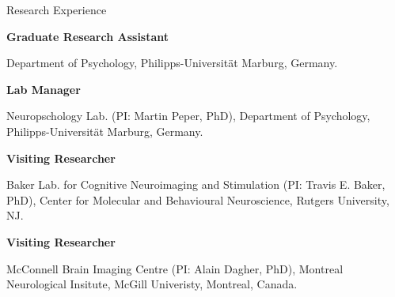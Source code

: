 \begin{rubric}{Research Experience}


\textbf{Graduate Research Assistant} 
\par Department of Psychology, Philipps-Universit\"at Marburg, Germany. 
\vspace{5pt}
\par \textbf{Lab Manager} 
\par Neuropschology Lab. (PI: Martin Peper, PhD), Department of Psychology, Philipps-Universit\"at Marburg, Germany.

\entry*[Oct 2018] 
\textbf{Visiting Researcher} \par Baker Lab. for Cognitive Neuroimaging and Stimulation (PI: Travis E. Baker, PhD), Center for Molecular and Behavioural Neuroscience, Rutgers University, NJ.

\textbf{Visiting Researcher} \par McConnell Brain Imaging Centre (PI: Alain Dagher, PhD), Montreal Neurological Insitute, McGill Univeristy, Montreal, Canada.

\end{rubric}
